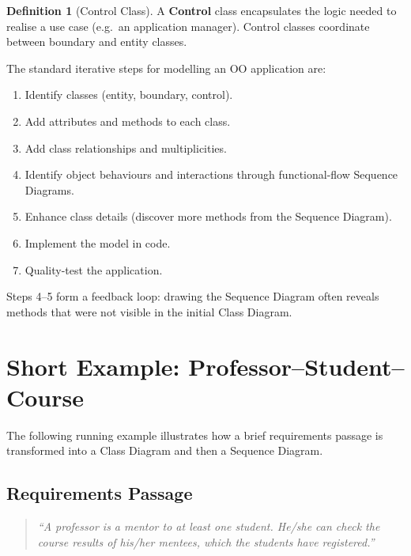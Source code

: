 \documentclass[11pt, a4paper, notitlepage]{report}
\theoremstyle{definition}
\newtheorem{definition}[theorem]{Definition}
\theoremstyle{remark}
\theoremstyle{definition}
\begin{document}
\begin{definition}[Control Class]
\label{def:ch8-control}
A \textbf{Control} class encapsulates the logic needed to realise a use case (e.g.\ an
application manager). Control classes coordinate between boundary and entity classes.
\end{definition}

\begin{keyresult}[title={Key Result: OO Modelling Steps}]
The standard iterative steps for modelling an OO application are:
\begin{enumerate}
  \item Identify classes (entity, boundary, control).
  \item Add attributes and methods to each class.
  \item Add class relationships and multiplicities.
  \item Identify object behaviours and interactions through functional-flow Sequence Diagrams.
  \item Enhance class details (discover more methods from the Sequence Diagram).
  \item Implement the model in code.
  \item Quality-test the application.
\end{enumerate}
Steps 4--5 form a feedback loop: drawing the Sequence Diagram often reveals methods that
were not visible in the initial Class Diagram.
\end{keyresult}

\section{Short Example: Professor--Student--Course}
\label{sec:ch8-short-example}

The following running example illustrates how a brief requirements passage is transformed
into a Class Diagram and then a Sequence Diagram.

\subsection{Requirements Passage}

\begin{quote}
\emph{``A professor is a mentor to at least one student. He/she can check the course results of
his/her mentees, which the students have registered.''}
\end{quote}
\end{document}
